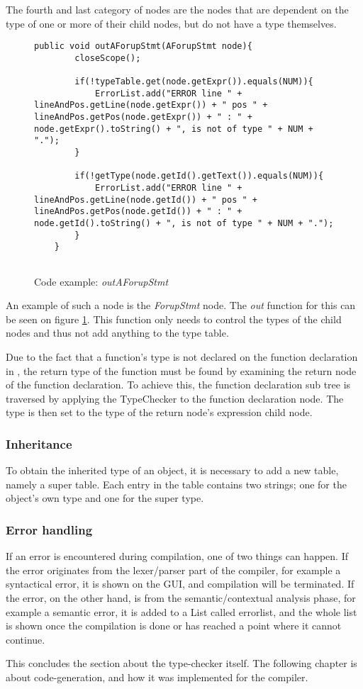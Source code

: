 The fourth and last category of nodes are the nodes that are dependent on the type of one or more of their child nodes, but do not have a type themselves.

\begin{figure}[H]
\centering
\begin{lstlisting}[]
    public void outAForupStmt(AForupStmt node){
        closeScope();

        if(!typeTable.get(node.getExpr()).equals(NUM)){
            ErrorList.add("ERROR line " + lineAndPos.getLine(node.getExpr()) + " pos " + lineAndPos.getPos(node.getExpr()) + " : " + node.getExpr().toString() + ", is not of type " + NUM + ".");
        }

        if(!getType(node.getId().getText()).equals(NUM)){
            ErrorList.add("ERROR line " + lineAndPos.getLine(node.getId()) + " pos " + lineAndPos.getPos(node.getId()) + " : " + node.getId().toString() + ", is not of type " + NUM + ".");
        }
    }
    
\end{lstlisting}
\caption{Code example: \textit{outAForupStmt}}
\label{fig:outAForupStmt}
\end{figure}

An example of such a node is the \textit{ForupStmt} node. The \textit{out} function for this can be seen on figure \ref{fig:outAForupStmt}. This function only needs to control the types of the child nodes and thus not add anything to the type table.

Due to the fact that a function's type is not declared on the function declaration in \lang{}, the return type of the function must be found by examining the return node of the function declaration. To achieve this, the function declaration sub tree is traversed by applying the TypeChecker to the function declaration node. The type is then set to the type of the return node's expression child node. 

\subsubsection{Inheritance}
To obtain the inherited type of an object, it is necessary to add a new table, namely a super table. Each entry in the table contains two strings; one for the object's own type and one for the super type.

\subsubsection{Error handling}
If an error is encountered during compilation, one of two things can happen. If the error originates from the lexer/parser part of the compiler, for example a syntactical error, it is shown on the GUI, and compilation will be terminated. If the error, on the other hand, is from the semantic/contextual analysis phase, for example a semantic error, it is added to a List called errorlist, and the whole list is shown once the compilation is done or has reached a point where it cannot continue.

This concludes the section about the type-checker itself. The following chapter is about code-generation, and how it was implemented for the \lang{} compiler. 
